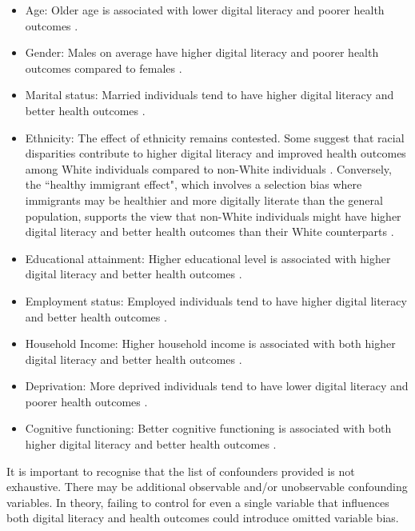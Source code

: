 \begin{itemize}
    \item Age: Older age is associated with lower digital literacy and poorer health outcomes \parencite{hall_digital_2015}.
    \item Gender: Males on average have higher digital literacy and poorer health outcomes compared to females \parencite{he_factors_2022}.
    \item Marital status: Married individuals tend to have higher digital literacy and better health outcomes \parencite{he_factors_2022}.
    \item Ethnicity: The effect of ethnicity remains contested. Some suggest that racial disparities contribute to higher digital literacy and improved health outcomes among White individuals compared to non-White individuals \parencite{mitchell_digital_2019}. Conversely, the ``healthy immigrant effect", which involves a selection bias where immigrants may be healthier and more digitally literate than the general population, supports the view that non-White individuals might have higher digital literacy and better health outcomes than their White counterparts \parencite{mcdonald_insights_2004}.
    \item Educational attainment: Higher educational level is associated with higher digital literacy and better health outcomes \parencite{hall_digital_2015}.
    \item Employment status: Employed individuals tend to have higher digital literacy and better health outcomes \parencite{he_factors_2022}. 
    \item Household Income: Higher household income is associated with both higher digital literacy and better health outcomes \parencite{he_factors_2022}.
    \item Deprivation: More deprived individuals tend to have lower digital literacy and poorer health outcomes \parencite{he_factors_2022}.
    \item Cognitive functioning: Better cognitive functioning is associated with both higher digital literacy and better health outcomes \parencite{hong_mediating_2023}.
\end{itemize}

It is important to recognise that the list of confounders provided is not exhaustive. There may be additional observable and/or unobservable confounding variables. In theory, failing to control for even a single variable that influences both digital literacy and health outcomes could introduce omitted variable bias.

